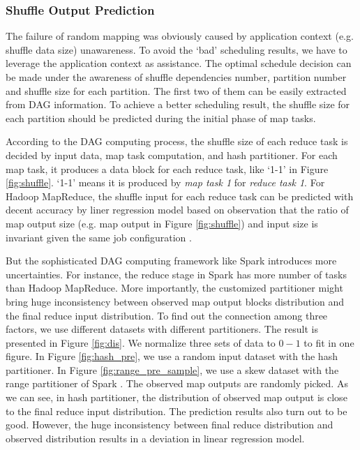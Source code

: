 \subsubsection{Shuffle Output Prediction}\label{shuffleprediction}
The failure of random mapping was obviously caused by application context (e.g. shuffle data size) unawareness. To avoid the `bad' scheduling results, we have to leverage the application context as assistance. The optimal schedule decision can be made under the awareness of shuffle dependencies number, partition number and shuffle size for each partition. The first two of them can be easily extracted from DAG information. To achieve a better scheduling result, the shuffle size for each partition should be predicted during the initial phase of map tasks.

According to the DAG computing process, the shuffle size of each reduce task is decided by input data, map task computation, and hash partitioner. For each map task, it produces a data block for each reduce task, like `1-1' in Figure \ref{fig:shuffle}. `1-1' means it is produced by \textit{map task 1} for \textit{reduce task 1}. For Hadoop MapReduce, the shuffle input for each reduce task can be predicted with decent accuracy by liner regression model based on observation that the ratio of map output size (e.g. map output in Figure \ref{fig:shuffle}) and input size is invariant given the same job configuration \cite{ishuffle, predict}.

But the sophisticated DAG computing framework like Spark introduces more uncertainties. For instance, the reduce stage in Spark has more number of tasks than Hadoop MapReduce. More importantly, the customized partitioner might bring huge inconsistency between observed map output blocks distribution and the final reduce input distribution. To find out the connection among three factors, we use different datasets with different partitioners. The result is presented in Figure \ref{fig:dis}. We normalize three sets of data to $0-1$ to fit in one figure. In Figure \ref{fig:hash_pre}, we use a random input dataset with the hash partitioner. In Figure \ref{fig:range_pre_sample}, we use a skew dataset with the range partitioner of Spark \cite{sparksource}.
The observed map outputs are randomly picked. As we can see, in hash partitioner, the distribution of observed map output is close to the final reduce input distribution. The prediction results also turn out to be good. However, the huge inconsistency between final reduce distribution and observed distribution results in a deviation in linear regression model.

